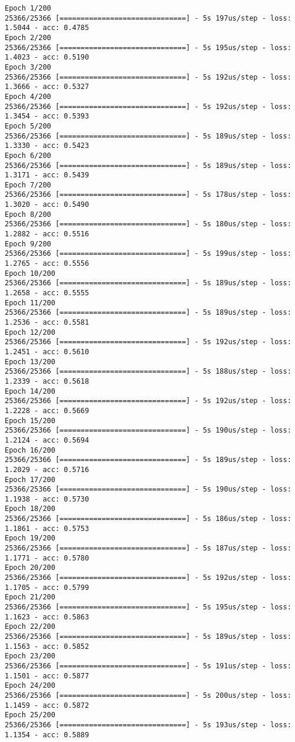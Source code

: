 \documentclass[11pt]{article}
\begin{document}
    \begin{Verbatim}[commandchars=\\\{\}]
Epoch 1/200
25366/25366 [==============================] - 5s 197us/step - loss: 1.5044 - acc: 0.4785
Epoch 2/200
25366/25366 [==============================] - 5s 195us/step - loss: 1.4023 - acc: 0.5190
Epoch 3/200
25366/25366 [==============================] - 5s 192us/step - loss: 1.3666 - acc: 0.5327
Epoch 4/200
25366/25366 [==============================] - 5s 192us/step - loss: 1.3454 - acc: 0.5393
Epoch 5/200
25366/25366 [==============================] - 5s 189us/step - loss: 1.3330 - acc: 0.5423
Epoch 6/200
25366/25366 [==============================] - 5s 189us/step - loss: 1.3171 - acc: 0.5439
Epoch 7/200
25366/25366 [==============================] - 5s 178us/step - loss: 1.3020 - acc: 0.5490
Epoch 8/200
25366/25366 [==============================] - 5s 180us/step - loss: 1.2882 - acc: 0.5516
Epoch 9/200
25366/25366 [==============================] - 5s 199us/step - loss: 1.2765 - acc: 0.5556
Epoch 10/200
25366/25366 [==============================] - 5s 189us/step - loss: 1.2658 - acc: 0.5555
Epoch 11/200
25366/25366 [==============================] - 5s 189us/step - loss: 1.2536 - acc: 0.5581
Epoch 12/200
25366/25366 [==============================] - 5s 192us/step - loss: 1.2451 - acc: 0.5610
Epoch 13/200
25366/25366 [==============================] - 5s 188us/step - loss: 1.2339 - acc: 0.5618
Epoch 14/200
25366/25366 [==============================] - 5s 192us/step - loss: 1.2228 - acc: 0.5669
Epoch 15/200
25366/25366 [==============================] - 5s 190us/step - loss: 1.2124 - acc: 0.5694
Epoch 16/200
25366/25366 [==============================] - 5s 189us/step - loss: 1.2029 - acc: 0.5716
Epoch 17/200
25366/25366 [==============================] - 5s 190us/step - loss: 1.1938 - acc: 0.5730
Epoch 18/200
25366/25366 [==============================] - 5s 186us/step - loss: 1.1861 - acc: 0.5753
Epoch 19/200
25366/25366 [==============================] - 5s 187us/step - loss: 1.1771 - acc: 0.5780
Epoch 20/200
25366/25366 [==============================] - 5s 192us/step - loss: 1.1705 - acc: 0.5799
Epoch 21/200
25366/25366 [==============================] - 5s 195us/step - loss: 1.1623 - acc: 0.5863
Epoch 22/200
25366/25366 [==============================] - 5s 189us/step - loss: 1.1563 - acc: 0.5852
Epoch 23/200
25366/25366 [==============================] - 5s 191us/step - loss: 1.1501 - acc: 0.5877
Epoch 24/200
25366/25366 [==============================] - 5s 200us/step - loss: 1.1459 - acc: 0.5872
Epoch 25/200
25366/25366 [==============================] - 5s 193us/step - loss: 1.1354 - acc: 0.5889

\end{Verbatim}
\end{document}
